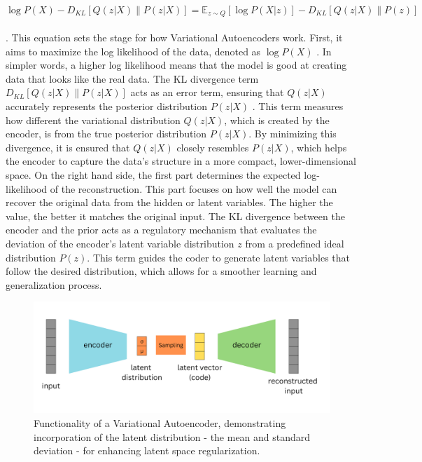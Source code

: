 \[
\log P(X) - D_{KL} \left[ Q(z|X) \parallel P(z|X) \right] = \mathbb{E}_{z \sim Q} \left[ \log P(X|z) \right] - D_{KL} \left[ Q(z|X) \parallel P(z) \right]
\]
\\

\citep{doerschVAE}.
This equation sets the stage for how Variational Autoencoders work. First, it aims to  maximize the log likelihood of the data, denoted as \(\log P(X)\) \citep{doerschVAE}. In simpler words, a higher log likelihood means that the model is good at creating data that looks like the real data. The KL divergence term \(D_{KL} \left[ Q(z|X) \parallel P(z|X) \right]\) acts as an error term, ensuring that \(Q(z|X)\) accurately represents the posterior distribution \(P(z|X)\) \citep{doerschVAE}. This term measures how different the variational distribution \(Q(z|X)\), which is created by the encoder, is from the true posterior distribution \(P(z|X)\). By minimizing this divergence, it is ensured that \(Q(z|X)\) closely resembles \(P(z|X)\), which helps the encoder to capture the data's structure in a more compact, lower-dimensional space. On the right hand side, the first part determines the expected log-likelihood of the reconstruction. This part focuses on how well the model can recover the original data from the hidden or latent variables. The higher the value, the better it matches the original input. The KL divergence between the encoder and the prior acts as a regulatory mechanism that evaluates the deviation of the encoder's latent variable distribution \(z\) from a predefined ideal distribution \( P(z)\). This term guides the coder to generate latent variables that follow the desired distribution, which allows for a smoother learning and generalization process.

\begin{figure}[ht]
    \centering
      \hspace{.8cm}
      \includegraphics[width=.9\columnwidth]{figures/VAE.png}
      \caption{Functionality of a Variational Autoencoder, demonstrating incorporation of the latent distribution - the mean and standard deviation - for enhancing latent space regularization.}
      \label{fig:figureVAE}
\end{figure}

